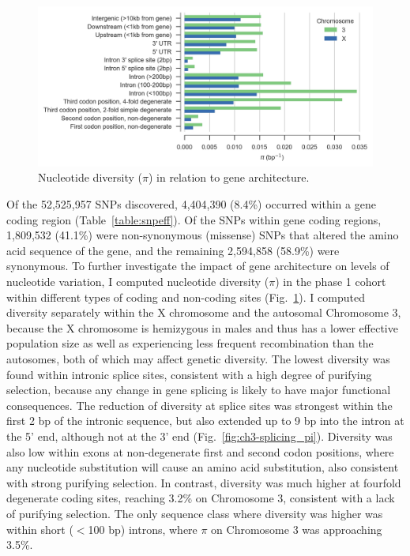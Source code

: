 \begin{refsection}
\begin{figure}[t!]
\centering
\includegraphics[width=1.1\textwidth,center]{artwork/chapter3/feature_pi.jpeg}
\caption{Nucleotide diversity ($\pi$) in relation to gene architecture.
}
%
\label{fig:ch3-feature_pi}
\end{figure}



%
Of the 52,525,957 SNPs discovered, 4,404,390 (8.4\%) occurred within a gene coding region (Table~\ref{table:snpeff}).
%
Of the SNPs within gene coding regions, 1,809,532 (41.1\%) were non-synonymous (missense) SNPs that altered the amino acid sequence of the gene, and the remaining 2,594,858 (58.9\%) were synonymous.
%
To further investigate the impact of gene architecture on levels of nucleotide variation, I computed nucleotide diversity ($\pi$) in the phase 1 cohort within different types of coding and non-coding sites (Fig.~\ref{fig:ch3-feature_pi}).
%
I computed diversity separately within the X chromosome and the autosomal Chromosome 3, because the X chromosome is hemizygous in males and thus has a lower effective population size as well as experiencing less frequent recombination than the autosomes, both of which may affect genetic diversity.
%
The lowest diversity was found within intronic splice sites, consistent with a high degree of purifying selection, because any change in gene splicing is likely to have major functional consequences.
%
The reduction of diversity at splice sites was strongest within the first 2 bp of the intronic sequence, but also extended up to 9 bp into the intron at the 5' end, although not at the 3' end (Fig.~\ref{fig:ch3-splicing_pi}).
%
Diversity was also low within exons at non-degenerate first and second codon positions, where any nucleotide substitution will cause an amino acid substitution, also consistent with strong purifying selection.
%
In contrast, diversity was much higher at fourfold degenerate coding sites, reaching 3.2\% on Chromosome 3, consistent with a lack of purifying selection.
%
The only sequence class where diversity was higher was within short ($<$100 bp) introns, where $\pi$ on Chromosome 3 was approaching 3.5\%.



\end{refsection}
